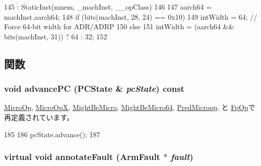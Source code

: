 \begin{DoxyCode}
145         : StaticInst(mnem, _machInst, __opClass)
146     {
147         aarch64 = machInst.aarch64;
148         if (bits(machInst, 28, 24) == 0x10)
149             intWidth = 64;  // Force 64-bit width for ADR/ADRP
150         else
151             intWidth = (aarch64 && bits(machInst, 31)) ? 64 : 32;
152     }
\end{DoxyCode}


\subsection{関数}
\hypertarget{classArmISA_1_1ArmStaticInst_af04cd01429462d48e635f3e01ced6257}{
\subsubsection[{advancePC}]{\setlength{\rightskip}{0pt plus 5cm}void advancePC (PCState \& {\em pcState}) const}}
\label{classArmISA_1_1ArmStaticInst_af04cd01429462d48e635f3e01ced6257}


\hyperlink{classArmISA_1_1MicroOp_af04cd01429462d48e635f3e01ced6257}{MicroOp}, \hyperlink{classArmISA_1_1MicroOpX_af04cd01429462d48e635f3e01ced6257}{MicroOpX}, \hyperlink{classArmISA_1_1MightBeMicro_af04cd01429462d48e635f3e01ced6257}{MightBeMicro}, \hyperlink{classArmISA_1_1MightBeMicro64_af04cd01429462d48e635f3e01ced6257}{MightBeMicro64}, \hyperlink{classArmISA_1_1PredMicroop_af04cd01429462d48e635f3e01ced6257}{PredMicroop}, と \hyperlink{classArmISA_1_1FpOp_af04cd01429462d48e635f3e01ced6257}{FpOp}で再定義されています。


\begin{DoxyCode}
185     {
186         pcState.advance();
187     }
\end{DoxyCode}
\hypertarget{classArmISA_1_1ArmStaticInst_afdc526dcb5bdd123d904d20430a4e4eb}{
\subsubsection[{annotateFault}]{\setlength{\rightskip}{0pt plus 5cm}virtual void annotateFault ({\bf ArmFault} $\ast$ {\em fault})}}
\label{classArmISA_1_1ArmStaticInst_afdc526dcb5bdd123d904d20430a4e4eb}



